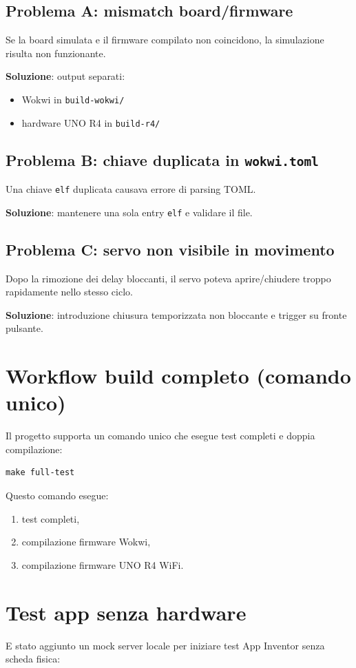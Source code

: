 \subsection{Problema A: mismatch board/firmware}
Se la board simulata e il firmware compilato non coincidono, la simulazione risulta non funzionante.

\textbf{Soluzione}: output separati:
\begin{itemize}
  \item Wokwi in \texttt{build-wokwi/}
  \item hardware UNO R4 in \texttt{build-r4/}
\end{itemize}

\subsection{Problema B: chiave duplicata in \texttt{wokwi.toml}}
Una chiave \texttt{elf} duplicata causava errore di parsing TOML.

\textbf{Soluzione}: mantenere una sola entry \texttt{elf} e validare il file.

\subsection{Problema C: servo non visibile in movimento}
Dopo la rimozione dei delay bloccanti, il servo poteva aprire/chiudere troppo rapidamente nello stesso ciclo.

\textbf{Soluzione}: introduzione chiusura temporizzata non bloccante e trigger su fronte pulsante.

\section{Workflow build completo (comando unico)}
Il progetto supporta un comando unico che esegue test completi e doppia compilazione:

\begin{lstlisting}[style=cppstyle]
make full-test
\end{lstlisting}

Questo comando esegue:
\begin{enumerate}
  \item test completi,
  \item compilazione firmware Wokwi,
  \item compilazione firmware UNO R4 WiFi.
\end{enumerate}

\section{Test app senza hardware}
E stato aggiunto un mock server locale per iniziare test App Inventor senza scheda fisica:

